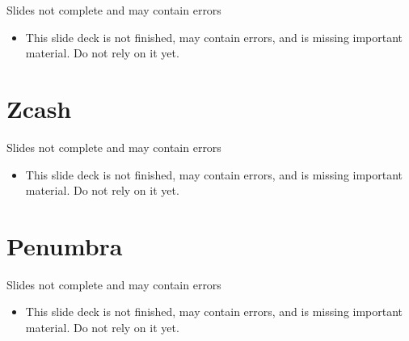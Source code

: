 \documentclass[aspectratio=169, lualatex, handout]{beamer}
\begin{document}
\begin{frame}{Slides not complete and may contain errors}
	\begin{itemize}
		\item This slide deck is not finished, may contain errors, and is missing important material. Do not rely on it yet.
	\end{itemize}
\end{frame}

\section{Zcash}

\begin{frame}{Slides not complete and may contain errors}
	\begin{itemize}
		\item This slide deck is not finished, may contain errors, and is missing important material. Do not rely on it yet.
	\end{itemize}
\end{frame}

\section{Penumbra}

\begin{frame}{Slides not complete and may contain errors}
	\begin{itemize}
		\item This slide deck is not finished, may contain errors, and is missing important material. Do not rely on it yet.
	\end{itemize}
\end{frame}

\begin{frame}[plain]
	\titlepage
\end{frame}
\end{document}
